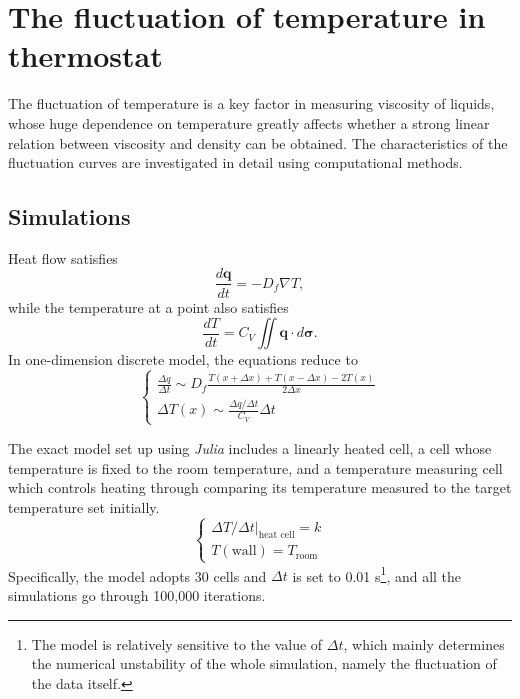 \documentclass[%
 reprint,
 amsmath,amssymb,
 aps,
]{revtex4-1}
\begin{document}
\tableofcontents

\section{The fluctuation of temperature in thermostat}
The fluctuation of temperature is a key factor in measuring viscosity of liquids, whose huge dependence on temperature greatly affects whether a strong linear relation between viscosity and density can be obtained. The characteristics of the fluctuation curves are investigated in detail using computational methods.

\subsection{Simulations}
Heat flow satisfies
\begin{equation}
\frac{d \mathbf{q}}{dt} = - D_f \nabla T,
\end{equation}
while the temperature at a point also satisfies
\begin{equation}
\frac{d T}{dt} = C_V \iint \mathbf{q}\cdot d\mathbf{\sigma}.
\end{equation}
In one-dimension discrete model, the equations reduce to
\begin{equation}
\begin{cases}
\frac{\Delta q}{\Delta t} \sim D_f \frac{T(x+\Delta x)+T(x-\Delta x)-2T(x)}{2\Delta x}\\
\Delta  T(x) \sim \frac{\Delta q /\Delta t}{C_V}\Delta t
\end{cases}
\end{equation}

The exact model set up using \emph{Julia} includes a linearly heated cell, a cell whose temperature is fixed to the room temperature, and a temperature measuring cell which controls heating through comparing its temperature measured to the target temperature set initially.
\begin{equation}
\begin{cases}
\Delta T/\Delta t |_{\text{heat cell}} = k \\
T(\text{wall}) = T_{\text{room}}
\end{cases}
\end{equation}
Specifically, the model adopts 30 cells and $\Delta t$ is set to 0.01 s\footnote{The model is relatively sensitive to the value of $\Delta t$, which mainly determines the numerical unstability of the whole simulation, namely the fluctuation of the data itself.}, and all the simulations go through 100,000 iterations.
\end{document}

